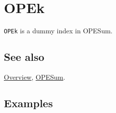 \documentclass[../FeynCalcManual.tex]{subfiles}
\begin{document}
\hypertarget{opek}{
\section{OPEk}\label{opek}}

\texttt{OPEk} is a dummy index in OPESum.

\subsection{See also}

\hyperlink{toc}{Overview}, \hyperlink{opesum}{OPESum}.

\subsection{Examples}
\end{document}
